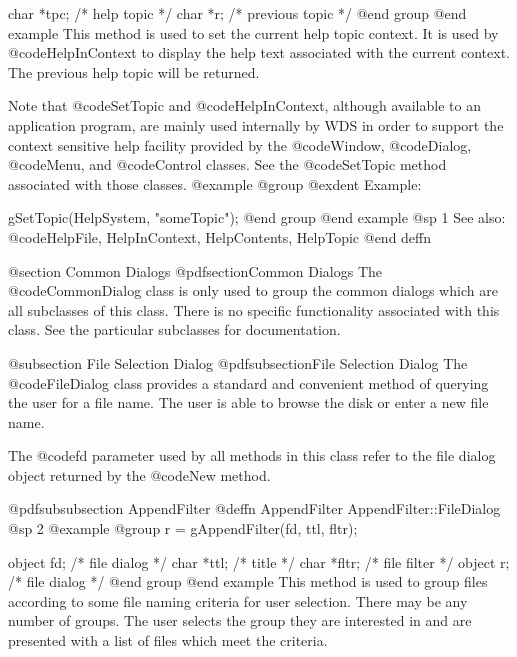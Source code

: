 char    *tpc;   /*  help topic      */
char    *r;     /*  previous topic  */
@end group
@end example
This method is used to set the current help topic context.  It is
used by @code{HelpInContext} to display the help text associated
with the current context.  The previous help topic will be returned.

Note that @code{SetTopic} and @code{HelpInContext}, although available
to an application program, are mainly used internally by WDS in order to
support the context sensitive help facility provided by the @code{Window},
@code{Dialog}, @code{Menu}, and @code{Control} classes.  See the
@code{SetTopic} method associated with those classes.
@example
@group
@exdent Example:

gSetTopic(HelpSystem, "someTopic");
@end group
@end example
@sp 1
See also:  @code{HelpFile, HelpInContext, HelpContents, HelpTopic}
@end deffn










@section Common Dialogs
@pdfsection{Common Dialogs}
The @code{CommonDialog} class is only used to group the common dialogs
which are all subclasses of this class.  There is no specific
functionality associated with this class.  See the particular subclasses
for documentation.






@subsection File Selection Dialog
@pdfsubsection{File Selection Dialog}
The @code{FileDialog} class provides a standard and convenient method of
querying the user for a file name.  The user is able to browse the disk
or enter a new file name.

The @code{fd} parameter used by all methods in this class refer to
the file dialog object returned by the @code{New} method.














@pdfsubsubsection {AppendFilter}
@deffn {AppendFilter} AppendFilter::FileDialog
@sp 2
@example
@group
r = gAppendFilter(fd, ttl, fltr);

object  fd;     /*  file dialog  */
char    *ttl;   /*  title        */
char    *fltr;  /*  file filter  */
object  r;      /*  file dialog  */
@end group
@end example
This method is used to group files according to some file naming
criteria for user selection.  There may be any number of groups.  The
user selects the group they are interested in and are presented with
a list of files which meet the criteria.

